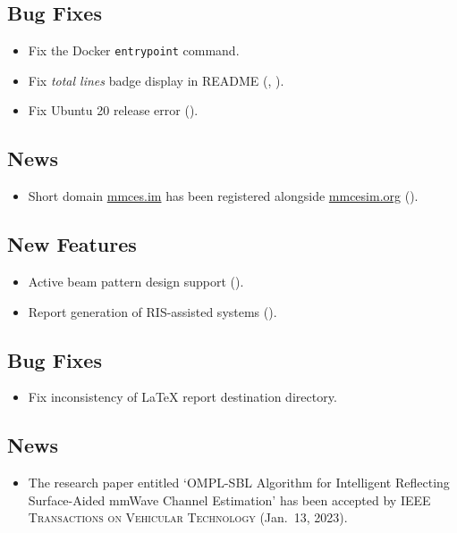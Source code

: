 \subsection*{Bug Fixes}
\begin{itemize}
  \item Fix the Docker \texttt{entrypoint} command.
  \item Fix \textit{total lines} badge display in README (, ).
  \item Fix Ubuntu 20 release error ().
\end{itemize}
\subsection*{News}
\begin{itemize}
  \item Short domain \href{https://mmces.im}{mmces.im} has been registered alongside \href{https://mmcesim.org}{mmcesim.org} ().
\end{itemize}

\subsection*{New Features}
\begin{itemize}
  \item Active beam pattern design support ().
  \item Report generation of RIS-assisted systems ().
\end{itemize}
\subsection*{Bug Fixes}
\begin{itemize}
  \item Fix inconsistency of \LaTeX{} report destination directory.
\end{itemize}
\subsection*{News}
\begin{itemize}
  \item The research paper entitled `OMPL-SBL Algorithm for Intelligent Reflecting Surface-Aided mmWave Channel Estimation' \cite{zhao2023ompl} has been accepted by \textsc{IEEE Transactions on Vehicular Technology} (Jan.~13, 2023).
\end{itemize}

